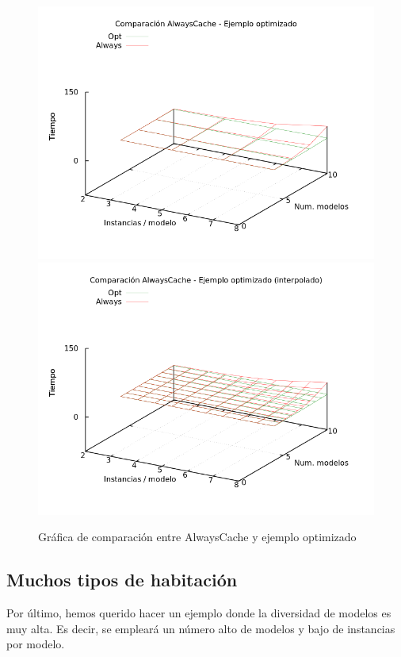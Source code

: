 \begin{figure}[H]
\centering
\includegraphics[scale=0.5]{img/comp-alw-opt}
\includegraphics[scale=0.5]{img/comp-alw-opt-spl}
\caption{Gráfica de comparación entre AlwaysCache y ejemplo optimizado
\label{fig:grfcompall}}
\end{figure}








\subsection{Muchos tipos de habitación}

Por último, hemos querido hacer un ejemplo donde la diversidad de modelos es muy alta. Es decir, se empleará un número alto de modelos y bajo de instancias por modelo.

